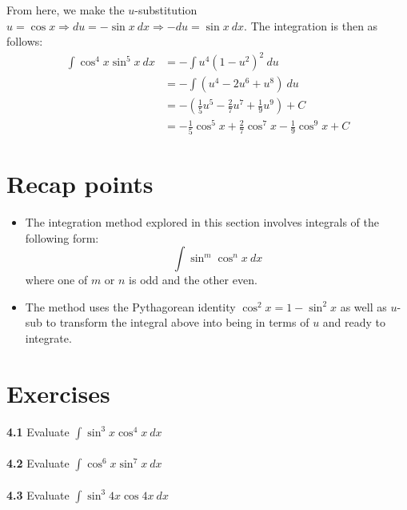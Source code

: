 \documentclass[11pt]{scrartcl}
\begin{document}
\noindent 
From here, we make the $u$-substitution $u=\cos x \Rightarrow du=-\sin x \ dx \Rightarrow -du=\sin x \ dx$. The integration is then as follows: 
\begin{align*}
     \int{\cos ^4 x \sin ^5 x} \ dx &=-\int{u^4(1-u^2)^2 \ du} \\
     &=-\int{(u^4-2u^6+u^8)} \ du \\
     &=-\left(\frac{1}{5}u^5-\frac{2}{7}u^7+\frac{1}{9}u^9\right) +C \\
     &=-\frac{1}{5}\cos ^5 x +\frac{2}{7}\cos ^7 x-\frac{1}{9}\cos ^9 x +C
\end{align*}
\section{Recap points}
\begin{itemize}
    \item The integration method explored in this section involves integrals of the following form:
    $$\int \sin ^m \cos ^n x \ dx$$
    \noindent 
    where one of $m$ or $n$ is odd and the other even.  
    \item The method uses the Pythagorean identity $\cos^2 x=1-\sin ^2 x$ as well as $u$-sub to transform the integral above into being in terms of $u$ and ready to integrate. 
\end{itemize}
\noindent 
\section{Exercises}
\noindent 
\textbf{4.1} Evaluate $\int{\sin ^3 x \cos ^4 x \ dx}$ \\
\\
\noindent 
\textbf{4.2} Evaluate $\int{\cos ^ 6 x \sin ^7 x \ dx}$ \\
\\
\noindent 
\textbf{4.3} Evaluate $\int{\sin ^3 4x \cos 4x \ dx}$ 
\end{document}
